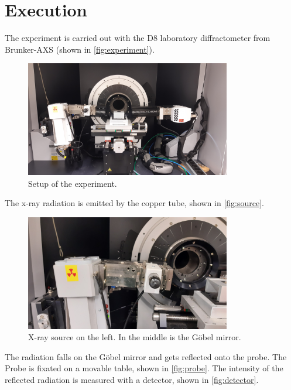 \section{Execution}
\label{sec:Durchführung}
The experiment is carried out with the D8 laboratory diffractometer from Brunker-AXS \cite{V44} (shown in \autoref{fig:experiment}). 
\begin{figure}
  \centering
  \includegraphics[width=0.8\textwidth]{images/aufbau.jpg}
  \caption{Setup of the experiment.}
  \label{fig:experiment}
\end{figure}
The x-ray radiation is emitted by the copper tube, shown in \autoref{fig:source}.
\begin{figure}
  \centering
  \includegraphics[width=0.8\textwidth]{images/quelle.jpg}
  \caption{X-ray source on the left.
  In the middle is the Göbel mirror.}
  \label{fig:source}
\end{figure}
The radiation falls on the Göbel mirror and gets reflected onto the probe.
The Probe is fixated on a movable table, shown in \autoref{fig:probe}.
The intensity of the reflected radiation is measured with a detector, shown in \autoref{fig:detector}. 

